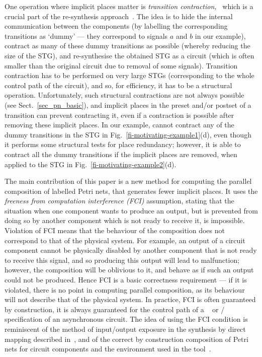 One operation where implicit places matter is \emph{transition contraction,}~\cite{vowo02lncs} which is a crucial part of the re-syn\-the\-sis approach~\cite{CN-02,KVL-96,PC-96}. The idea is to hide the internal communication between the components (by labelling the corresponding transitions as `dummy' --- they correspond to signals $a$ and $b$ in our example), contract as many of these dummy transitions as possible (whereby reducing the size of the STG), and re-synthesise the obtained STG as a circuit (which is often smaller than the original circuit due to removal of some signals). Transition contraction has to be performed on very large STGs (corresponding to the whole control path of the circuit), and so, for efficiency, it has to be a structural operation. Unfortunately, such structural contractions are not always possible (see Sect.~\ref{sec_pn_basic}), and implicit places in the preset and/or postset of a transition can prevent contracting it, even if a contraction is possible after removing these implicit places. In our example, \desij cannot contract any of the dummy transitions in the STG in Fig.~\ref{fi-motivating-example1}(d), even though it performs some structural tests for place redundancy; however, it is able to contract all the dummy transitions if the implicit places are removed, \ie when applied to the STG in Fig.~\ref{fi-motivating-example2}(d).

The main contribution of this paper is a new me\-thod for computing the parallel composition of labelled Petri nets, that generates fewer implicit places. It uses the \emph{freeness from computation interference (FCI)} assumption, stating that the situation when one component wants to produce an output, but is prevented from doing so by another component which is not ready to receive it, is impossible. Violation of FCI means that the behaviour of the composition does not correspond to that of the physical system. For example, an output of a circuit component cannot be physically disabled by another component that is not ready to receive this signal, and so producing this output will lead to malfunction; however, the composition will be oblivious to it, and behave as if such an output could not be produced.
Hence FCI is a basic correctness requirement --- if it is violated, there is no point in computing parallel composition, as its behaviour will not describe that of the physical system. In practice, FCI is often guaranteed by construction, \eg it is always guaranteed for the control path of a \balsa~\cite{EB-02} or \haste/\tangram~\cite{berkel91,haste-manual} specification of an asynchronous circuit. The idea of using the FCI condition is reminiscent of the method of input/output exposure in the synthesis by direct mapping described in~\cite{SBY-07}, and of the correct by construction composition of Petri nets for circuit components and the environment used in the \ditopn tool~\cite{JF-00}.


